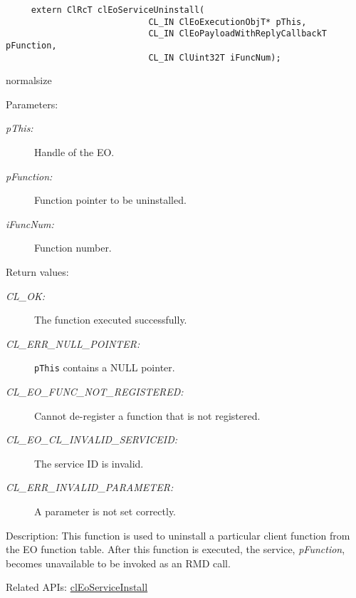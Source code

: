 \begin{flushleft}
\begin{Desc}
\footnotesize\begin{verbatim}     extern ClRcT clEoServiceUninstall(
                 			CL_IN ClEoExecutionObjT* pThis,
                 			CL_IN ClEoPayloadWithReplyCallbackT pFunction,
                 			CL_IN ClUint32T iFuncNum);
\end{verbatim}
  normalsize
\end{Desc}
\begin{Desc}
\item[Parameters:]
\begin{description}
\item[{\em p\-This:}]Handle of the EO. 
\item[{\em p\-Function:}]Function pointer to be uninstalled. 
\item[{\em i\-Func\-Num:}]Function number.\end{description}
\end{Desc}
\begin{Desc}
\item[Return values:]
\begin{description}
\item[{\em CL\_\-OK:}]The function executed successfully. 
\item[{\em CL\_\-ERR\_\-NULL\_\-POINTER:}]{\tt{pThis}} contains a NULL pointer. 
\item[{\em CL\_\-EO\_\-FUNC\_\-NOT\_\-REGISTERED:}]Cannot de-register a function that is not registered.
\item[{\em CL\_\-EO\_\-CL\_\-INVALID\_\-SERVICEID:}]The service ID is invalid.
\item[{\em CL\_\-ERR\_\-INVALID\_\-PARAMETER:}]A parameter is not set correctly.\end{description}
\end{Desc}
\begin{Desc}
\item[Description:]This function is used to uninstall a particular client function from the EO function table. After this function is executed, 
the service, {\em p\-Function\/}, becomes unavailable to be invoked as an RMD call.\end{Desc}
\begin{Desc}
\item[Related APIs:]\hyperlink{pageeo110}{cl\-Eo\-Service\-Install} \end{Desc}




  \newpage

\end{flushleft}
